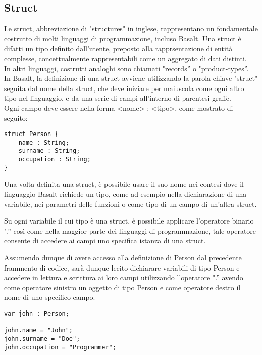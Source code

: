 \subsection{Struct}
Le struct, abbreviazione di "structures" in inglese, rappresentano un fondamentale costrutto di molti 
linguaggi di programmazione, incluso Basalt. Una struct è difatti un tipo definito dall’utente, preposto alla 
rapprsentazione di entità complesse, concettualmente rappresentabili come un aggregato di dati distinti. \\

In altri linguaggi, costrutti analoghi sono chiamati "records” o "product-types”. \\

In Basalt, la definizione di una struct avviene utilizzando la parola chiave "struct" seguita dal nome della struct, 
che deve iniziare per maiuscola come ogni altro tipo nel linguaggio, e da una serie di campi all'interno di parentesi graffe. \\

Ogni campo deve essere nella forma <nome> : <tipo>, come mostrato di seguito:

\vspace{0.5cm}
\begin{lstlisting}[frame=single]
struct Person {
    name : String;
    surname : String;
    occupation : String;
}
\end{lstlisting}
\vspace{0.5cm}


Una volta definita una struct, è possibile usare il suo nome nei contesi dove il linguaggio Basalt richiede un tipo, come ad esempio nella dichiarazione di una variabile, nei parametri delle funzioni o come tipo di un campo di un’altra struct. 

Su ogni variabile il cui tipo è una struct, è possibile applicare l’operatore binario ".” così come nella maggior parte dei linguaggi di programmazione, tale operatore consente di accedere ai campi uno specifica istanza di una struct. 

Assumendo dunque di avere accesso alla definizione di Person dal precedente frammento di codice, sarà dunque lecito dichiarare variabili di tipo Person e accedere in lettura e scrittura ai loro campi utilizzando l’operatore ".” avendo come operatore sinistro un oggetto di tipo Person e come operatore destro il nome di uno specifico campo.

\vspace{0.5cm}
\begin{lstlisting}[frame=single]
var john : Person;

john.name = "John";
john.surname = "Doe";
john.occupation = "Programmer";
\end{lstlisting}
\vspace{0.5cm}

\newpage

 \newpage
 \newpage
 \newpage
